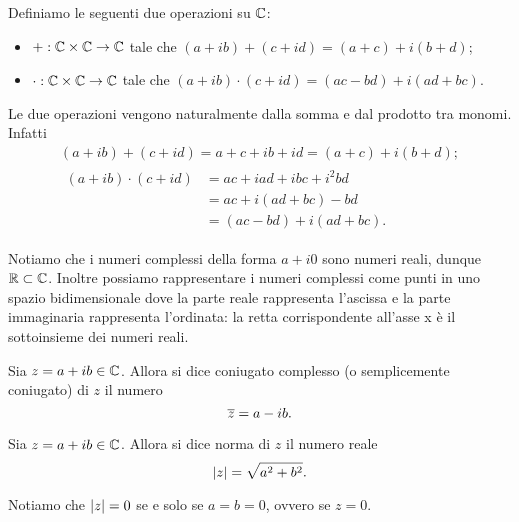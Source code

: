 \begin{definition}
    Definiamo le seguenti due operazioni su $\mathbb{C}$:
    \begin{itemize}
        \item $+ : \mathbb{C} \times \mathbb{C} \to \mathbb{C}$ tale che $(a + ib) + (c + id) = (a + c) + i(b + d)$;
        \item $\cdot : \mathbb{C} \times \mathbb{C} \to \mathbb{C}$ tale che $(a + ib) \cdot (c + id) = (ac - bd) + i(ad + bc)$.
    \end{itemize}
\end{definition}

\begin{remark}
    Le due operazioni vengono naturalmente dalla somma e dal prodotto tra monomi. Infatti \begin{gather*}
        (a + ib) + (c + id) = a + c + ib + id = (a + c) + i(b + d);\\
        \begin{alignedat}{1}
            (a + ib) \cdot (c + id) &= ac + iad + ibc + i^2bd \\
            &= ac + i(ad + bc) -bd \\
            &= (ac - bd) + i(ad + bc).
        \end{alignedat}
    \end{gather*}
\end{remark}

Notiamo che i numeri complessi della forma $a + i0$ sono numeri reali, dunque $\mathbb{R} \subset \mathbb{C}$. Inoltre possiamo rappresentare i numeri complessi come punti in uno spazio bidimensionale dove la parte reale rappresenta l'ascissa e la parte immaginaria rappresenta l'ordinata: la retta corrispondente all'asse x è il sottoinsieme dei numeri reali.

\begin{definition}
    Sia $z = a+ib \in \mathbb{C}$. Allora si dice coniugato complesso (o semplicemente coniugato) di $z$ il numero \[
        \overline{z} = a - ib.    
    \]
\end{definition}

\begin{definition}
    Sia $z = a + ib \in \mathbb{C}$. Allora si dice norma di $z$ il numero reale \[
        \left|z\right| = \sqrt{a^2 + b^2}.    
    \]
\end{definition}

Notiamo che $\left|z\right| = 0$ se e solo se $a = b = 0$, ovvero se $z = 0$.


